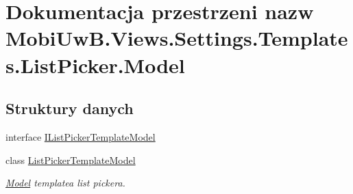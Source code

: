 \hypertarget{a00284}{}\section{Dokumentacja przestrzeni nazw Mobi\+Uw\+B.\+Views.\+Settings.\+Templates.\+List\+Picker.\+Model}
\label{a00284}
\subsection*{Struktury danych}
\begin{DoxyCompactItemize}
\item 
interface \hyperlink{a00024}{I\+List\+Picker\+Template\+Model}
\item 
class \hyperlink{a00037}{List\+Picker\+Template\+Model}
\begin{DoxyCompactList}\small\item\em \hyperlink{a00284}{Model} templatea list pickera. \end{DoxyCompactList}\end{DoxyCompactItemize}
